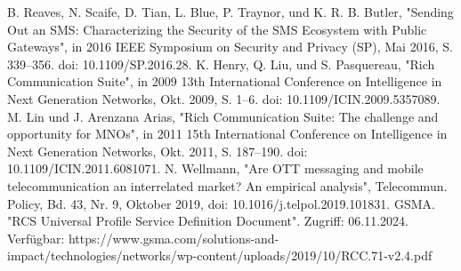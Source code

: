 \documentclass[conference]{IEEEtran}
\begin{document}
\begin{thebibliography}{00}
     B. Reaves, N. Scaife, D. Tian, L. Blue, P. Traynor, und K. R. B. Butler, "Sending Out an SMS: Characterizing the Security of the SMS Ecosystem with Public Gateways", in 2016 IEEE Symposium on Security and Privacy (SP), Mai 2016, S. 339–356. doi: 10.1109/SP.2016.28.
     K. Henry, Q. Liu, und S. Pasquereau, "Rich Communication Suite", in 2009 13th International Conference on Intelligence in Next Generation Networks, Okt. 2009, S. 1–6. doi: 10.1109/ICIN.2009.5357089.
     M. Lin und J. Arenzana Arias, "Rich Communication Suite: The challenge and opportunity for MNOs", in 2011 15th International Conference on Intelligence in Next Generation Networks, Okt. 2011, S. 187–190. doi: 10.1109/ICIN.2011.6081071.
     N. Wellmann, "Are OTT messaging and mobile telecommunication an interrelated market? An empirical analysis", Telecommun. Policy, Bd. 43, Nr. 9, Oktober 2019, doi: 10.1016/j.telpol.2019.101831.
     GSMA. "RCS Universal Profile Service Definition Document". Zugriff: 06.11.2024. Verfügbar: https://www.gsma.com/solutions-and-impact/technologies/networks/wp-content/uploads/2019/10/RCC.71-v2.4.pdf
\end{thebibliography}
\end{document}
